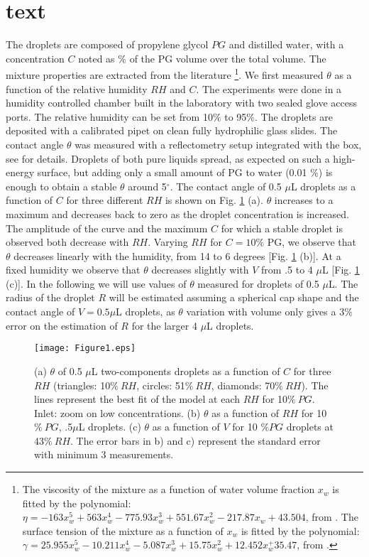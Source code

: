 \documentclass[aps,prl,reprint,superscriptaddress,amsmath,amssymb,]{revtex4-1}
\begin{document}
\section*{text}

The droplets are composed of propylene glycol $PG$ and distilled water, with a concentration $C$ noted as $\%$ of the PG volume over the total volume. The mixture properties are extracted from the literature \footnote{The viscosity of the mixture as a function of water volume fraction $x_w$ is fitted by the polynomial: $\eta= -163 x_w^5+563 x_w^4-775.93x_w^3+551.67 x_w^2-217.87x_w +43.504$, from \cite{george2003densities}. The surface tension of the mixture as a function of $x_w$ is fitted by the polynomial: $\gamma= 25.955 x_w^5-10.211 x_w^4-5.087 x_w^3 +15.75 x_w^2+12.452 x_w^+35.47$, from \cite{karpitschka2010quantitative}.}. We first measured $\theta$ as a function of the relative humidity $RH$ and $C$.
The experiments were done in a humidity controlled chamber built in the laboratory with two sealed glove access ports. The relative humidity can be set from 10\% to 95$\%$. The droplets are deposited with a calibrated pipet on clean fully hydrophilic glass slides. The contact angle $\theta$ was measured with a reflectometry setup \cite{Allain-1985} integrated with the box, see \cite{Cira-2015} for details. Droplets of both pure liquids spread, as expected on such a high-energy surface, but adding only a small amount of PG to water (0.01 $\%$) is enough to obtain a stable $\theta$ around 5$^\circ$. The contact angle of 0.5 $\mu$L droplets as a function of $C$ for three different $RH$ is shown on Fig. \ref{figure1} (a). $\theta$ increases to a maximum and decreases back to zero as the droplet concentration is increased. The amplitude of the curve and the maximum $C$ for which a stable droplet is observed both decrease with $RH$. Varying $RH$ for $C= 10\%$ PG, we observe that $\theta$ decreases linearly with the humidity, from 14 to 6 degrees [Fig. \ref{figure1} (b)]. At a fixed humidity we observe that $\theta$ decreases slightly with $V$ from .5 to 4 $\mu$L [Fig. \ref{figure1} (c)]. In the following we will use values of $\theta$ measured for droplets of 0.5 $\mu$L. The radius of the droplet $R$ will be estimated assuming a spherical cap shape and the contact angle of $V=0.5 \mu$L droplets, as $\theta$ variation with volume only gives a 3$\%$ error on the estimation of $R$ for the larger 4 $\mu$L droplets.

\begin{figure}
\texttt{[image: Figure1.eps]}
\caption{(a) $\theta$ of 0.5 $\mu$L two-components droplets as a function of $C$ for three $RH$ (triangles: 10$\%~RH$, circles: 51$\%~RH$, diamonds: 70$\%~RH$). The lines represent the best fit of the model at each $RH$ for 10$\%~PG$. Inlet: zoom on low concentrations. (b) $\theta$ as a function of $RH$ for 10$\%~PG$, .5$\mu$L droplets. (c) $\theta$ as a function of $V$ for 10 $\% PG$ droplets at 43$\%~RH$. The error bars in b) and c) represent the standard error with minimum 3 measurements.}
\label{figure1}
\end{figure}
\end{document}
